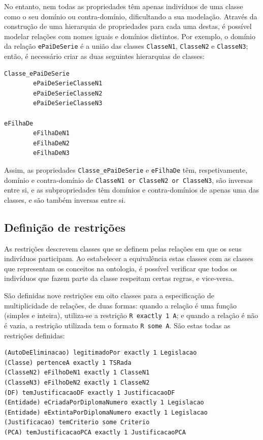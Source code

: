 \documentclass{article}
\begin{document}
No entanto, nem todas as propriedades têm apenas indivíduos de uma classe como o seu domínio ou contra-domínio, dificultando a sua modelação. Através da construção de uma hierarquia de propriedades para cada uma destas, é possível modelar relações com nomes iguais e domínios distintos. Por exemplo, o domínio da relação \texttt{ePaiDeSerie} é a união das classes \texttt{ClasseN1}, \texttt{ClasseN2} e \texttt{ClasseN3}; então, é necessário criar as duas seguintes hierarquias de classes:

\begin{verbatim}
Classe_ePaiDeSerie
        ePaiDeSerieClasseN1
        ePaiDeSerieClasseN2
        ePaiDeSerieClasseN3

eFilhaDe
        eFilhaDeN1
        eFilhaDeN2
        eFilhaDeN3
\end{verbatim}

Assim, as propriedades \texttt{Classe\_ePaiDeSerie} e \texttt{eFilhaDe} têm, respetivamente, domínio e contra-domínio de \texttt{ClasseN1 or ClasseN2 or ClasseN3}, são inversas entre si, e as subpropriedades têm domínios e contra-domínios de apenas uma das classes, e são também inversas entre si.

\subsection{Definição de restrições}

As restrições descrevem classes que se definem pelas relações em que os seus indivíduos participam. Ao estabelecer a equivalência estas classes com as classes que representam os conceitos na ontologia, é possível verificar que todos os indivíduos que fazem parte da classe respeitam certas regras, e vice-versa.

São definidas nove restrições em oito classes para a especificação de multiplicidade de relações, de duas formas: quando a relação é uma função (simples e inteira), utiliza-se a restrição \texttt{R exactly 1 A}; e quando a relação é não é vazia, a restrição utilizada tem o formato \texttt{R some A}. São estas todas as restrições definidas:

\begin{verbatim}
(AutoDeEliminacao) legitimadoPor exactly 1 Legislacao
(Classe) pertenceA exactly 1 TSRada
(ClasseN2) eFilhoDeN1 exactly 1 ClasseN1
(ClasseN3) eFilhoDeN2 exactly 1 ClasseN2
(DF) temJustificacaoDF exactly 1 JustificacaoDF
(Entidade) eCriadaPorDiplomaNumero exactly 1 Legislacao
(Entidade) eExtintaPorDiplomaNumero exactly 1 Legislacao
(Justificacao) temCriterio some Criterio
(PCA) temJustificacaoPCA exactly 1 JustificacaoPCA 
\end{verbatim}
\end{document}
